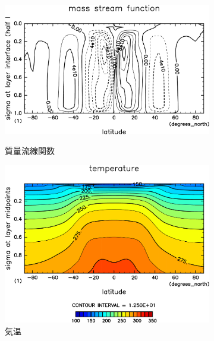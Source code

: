 \documentclass[body]{subfiles}
\begin{document}
\begin{figure}[t]
\begin{subfigure}{.4\textwidth}
		\centering
		\includegraphics[width=\textwidth]{S1366-nc/MSF,time=3650:4015-crop-rotate.pdf}
		\\\vspace{24pt}
		\caption{質量流線関数\hmu*{[kg/s]}}\label{S1366nc質量流線関数}
	\end{subfigure}
	\begin{subfigure}{.4\textwidth}
		\centering
		\includegraphics[width=\textwidth]{S1366-nc/Temp,time=3650:4015-crop-rotate.pdf}
		\caption{気温\hmu*{[K]}}\label{S1366nc気温分布}
	\end{subfigure}
	\begin{subfigure}{.4\textwidth}
		\centering

\end{subfigure}
\end{figure}
\end{document}
